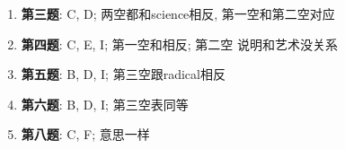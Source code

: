     \begin{enumerate}
      \item \textbf{第三题}: C, D; 两空都和science相反, 第一空和第二空对应
      \item \textbf{第四题}: C, E, I; 第一空和相反; 第二空
      说明和艺术没关系
      \item \textbf{第五题}: B, D, I; 第三空跟radical相反
      \item \textbf{第六题}: B, D, I; 第三空表同等
      \item \textbf{第八题}: C, F; 
      意思一样
    \end{enumerate}
